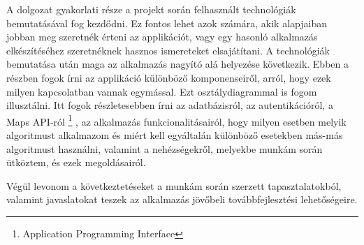 A dolgozat gyakorlati része a projekt során felhasznált technológiák bemutatásával fog kezdődni. Ez fontos lehet azok számára, akik alapjaiban jobban meg szeretnék érteni az applikációt, vagy egy hasonló alkalmazás elkészítéséhez szeretnéknek hasznos ismereteket elsajátítani. A technológiák bemutatása után maga az alkalmazás nagyító alá helyezése következik. Ebben a részben fogok írni az applikáció különböző komponenseiről, arról, hogy ezek milyen kapcsolatban vannak egymással. Ezt osztálydiagrammal is fogom illusztálni. Itt fogok részletesebben írni az adatbázisról, az autentikációról, a Maps API-ról%
\footnote{ %
	Application Programming Interface
}  %
, az alkalmazás funkcionalitásairól, hogy milyen esetben melyik algoritmust alkalmazom és miért kell egyáltalán különböző esetekben más-más algoritmust használni, valamint a nehézségekről, melyekbe munkám során ütköztem, és ezek megoldásairól.

Végül levonom a következtetéseket a munkám során szerzett tapasztalatokból, valamint javaslatokat teszek az alkalmazás jövőbeli továbbfejlesztési lehetőségeire.
